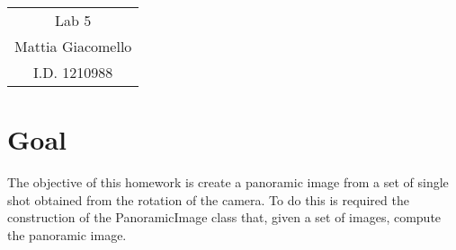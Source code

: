 \documentclass[11pt,a4paper]{article}
\newcommand{\cc}{\fontfamily{txtt}\selectfont}
\begin{document}
\begin{center}
\begin{tabular}{c}
\LARGE{Lab 5}\\
\large{Mattia Giacomello}\\
I.D. 1210988
\end{tabular}
\end{center}

\section{Goal}
The objective of this homework is create a panoramic image from a set of single shot obtained from the rotation of the camera. To do this is required the construction of the {\cc PanoramicImage} class that, given a set of images, compute the panoramic image.
\end{document}
